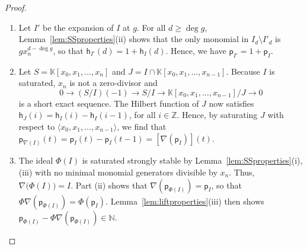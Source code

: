 \documentclass[12pt]{amsart}%
\theoremstyle{definition}%
\newcommand{\hf}{\mathsf{h}}%
\newcommand{\hp}{\mathsf{p}}%
\newcommand{\lift}{\Phi}%
\newcommand{\kk}{\mathbb{K}}%
\newcommand{\NN}{\mathbb{N}}%
\newcommand{\ZZ}{\mathbb{Z}}%
\begin{document}
\begin{proof} $\;$
  \begin{enumerate}
  \item Let $I'$ be the expansion of $I$ at $g$.  For all $d \ge \deg
    g$, Lemma~\ref{lem:SSproperties}(ii) shows that the only monomial
    in $I_d \setminus I'_d$ is $g x_n^{d - \deg g}$, so that
    $\hf_{I'}(d) = 1 + \hf_I(d)$.  Hence, we have $\hp_{I'} = 1 +
    \hp_I$.

  \item Let $S = \kk[x_0, x_1, \dotsc, x_n]$ and $J = I \cap \kk[x_0,
    x_1, \dotsc, x_{n-1}]$.  Because $I$ is saturated, $x_n$ is not a
    zero-divisor and
  \[ 
  0 \longrightarrow \left( S/I \right)(-1) \longrightarrow S/I
  \longrightarrow \kk[x_0, x_1, \dotsc, x_{n-1}] / J \longrightarrow 0
  \]
  is a short exact sequence.  The Hilbert function of $J$ now
  satisfies $\hf_{J}(i) = \hf_I(i) - \hf_I(i-1)$, for all $i \in \ZZ$.
  Hence, by saturating $J$ with respect to $\langle x_0, x_1, \dotsc,
  x_{n-1} \rangle$, we find that $\hp_{\nabla \left( I \right)}(t) =
  \hp_I(t) - \hp_I(t-1) = \left[ \nabla (\hp_I) \right](t)$.

  \item The ideal $\lift ( I )$ is saturated strongly stable by
    Lemma~\ref{lem:SSproperties}(i),(iii) with no minimal monomial
    generators divisible by $x_n$.  Thus, $\nabla \bigl( \lift ( I )
    \bigr) = I$.  Part (ii) shows that $\nabla (\hp_{\lift ( I )}) =
    \hp_I$, so that $\lift \nabla (\hp_{\lift ( I )}) = \lift
    (\hp_I)$.  Lemma~\ref{lem:liftproperties}(iii) then shows
    $\hp_{\lift ( I )} - \lift \nabla (\hp_{\lift ( I )}) \in
    \NN$. \qedhere
  \end{enumerate}
\end{proof}
\end{document}
